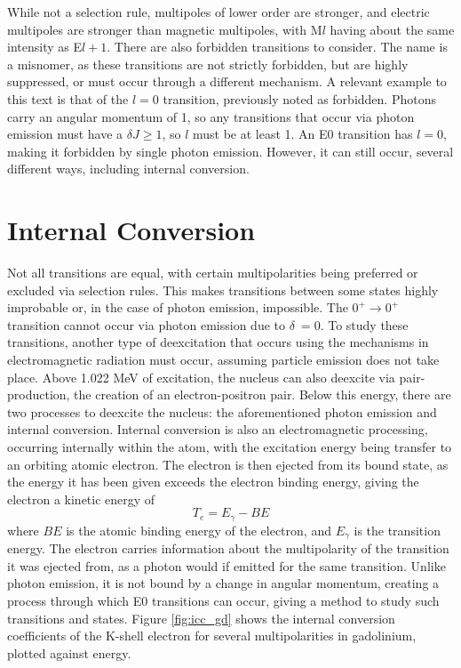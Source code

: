 While not a selection rule, multipoles of lower order are stronger, and electric multipoles are stronger than magnetic multipoles, with M$l$ having about the same intensity as E$l+1$. There are also forbidden transitions to consider. The name is a misnomer, as these transitions are not strictly forbidden, but are highly suppressed, or must occur through a different mechanism. A relevant example to this text is that of the $l=0$ transition, previously noted as forbidden. Photons carry an angular momentum of 1, so any transitions that occur via photon emission must have a $\delta J \geq 1$, so $l$ must be at least 1. An E0 transition has $l=0$, making it forbidden by single photon emission. However, it can still occur, several different ways, including internal conversion.

\section{Internal Conversion}

Not all transitions are equal, with certain multipolarities being preferred or excluded via selection rules. This makes transitions between some states highly improbable or, in the case of photon emission, impossible. The $0^+\rightarrow0^+$ transition cannot occur via photon emission due to $\delta \ = 0$. To study these transitions, another type of deexcitation that occurs using the mechanisms in electromagnetic radiation must occur, assuming particle emission does not take place. Above 1.022 MeV of excitation, the nucleus can also deexcite via pair-production, the creation of an electron-positron pair. Below this energy, there are two processes to deexcite the nucleus: the aforementioned photon emission and internal conversion. Internal conversion  is also an electromagnetic processing, occurring internally within the atom, with the excitation energy being transfer to an orbiting atomic electron. The electron is then ejected from its bound state, as the energy it has been given exceeds the electron binding energy, giving the electron a kinetic energy of 
\begin{equation}
    T_e = E_{\gamma}-BE
\end{equation} 
where $BE$ is the atomic binding energy of the electron, and $E_{\gamma}$ is the transition energy. The electron carries information about the multipolarity of the transition it was ejected from, as a photon would if emitted for the same transition. Unlike photon emission, it is not bound by a change in angular momentum, creating a process through which E0 transitions can occur, giving a method to study such transitions and states. Figure \ref{fig:icc_gd} shows the internal conversion coefficients of the K-shell electron for several multipolarities in gadolinium, plotted against energy.

